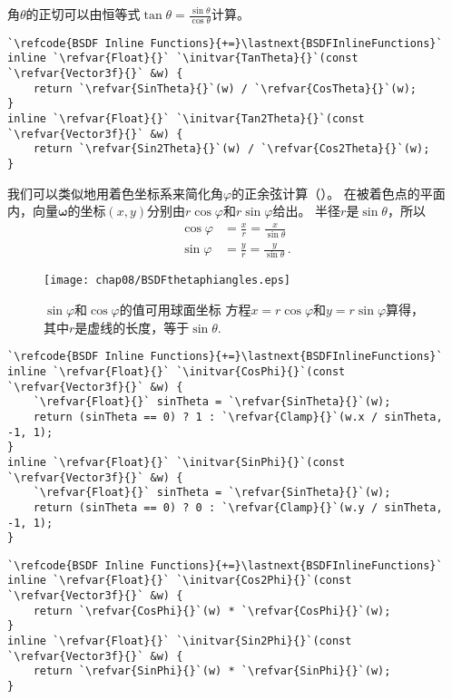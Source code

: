 角$\theta$的正切可以由恒等式$\displaystyle\tan\theta=\frac{\sin\theta}{\cos\theta}$计算。
\begin{lstlisting}
`\refcode{BSDF Inline Functions}{+=}\lastnext{BSDFInlineFunctions}`
inline `\refvar{Float}{}` `\initvar{TanTheta}{}`(const `\refvar{Vector3f}{}` &w) {
    return `\refvar{SinTheta}{}`(w) / `\refvar{CosTheta}{}`(w);
}
inline `\refvar{Float}{}` `\initvar{Tan2Theta}{}`(const `\refvar{Vector3f}{}` &w) {
    return `\refvar{Sin2Theta}{}`(w) / `\refvar{Cos2Theta}{}`(w);
}
\end{lstlisting}

我们可以类似地用着色坐标系来简化角$\varphi$的正余弦计算（）。
在被着色点的平面内，向量$\bm\omega$的坐标$(x,y)$分别由$r\cos\varphi$和$r\sin\varphi$给出。
半径$r$是$\sin\theta$，所以
\begin{align*}
      \cos\varphi & =\frac{x}{r}=\frac{x}{\sin\theta}\,   \\
      \sin\varphi & =\frac{y}{r}=\frac{y}{\sin\theta}\, .
\end{align*}

\begin{figure}[htbp]
      \centering
      \texttt{[image: chap08/BSDFthetaphiangles.eps]}
      \caption{$\sin\varphi$和$\cos\varphi$的值可用球面坐标
            方程$x=r\cos\varphi$和$y=r\sin\varphi$算得，其中$r$是虚线的长度，等于$\sin\theta$.}
      \label{fig:8.3}
\end{figure}

\begin{lstlisting}
`\refcode{BSDF Inline Functions}{+=}\lastnext{BSDFInlineFunctions}`
inline `\refvar{Float}{}` `\initvar{CosPhi}{}`(const `\refvar{Vector3f}{}` &w) {
    `\refvar{Float}{}` sinTheta = `\refvar{SinTheta}{}`(w);
    return (sinTheta == 0) ? 1 : `\refvar{Clamp}{}`(w.x / sinTheta, -1, 1);
}
inline `\refvar{Float}{}` `\initvar{SinPhi}{}`(const `\refvar{Vector3f}{}` &w) {
    `\refvar{Float}{}` sinTheta = `\refvar{SinTheta}{}`(w);
    return (sinTheta == 0) ? 0 : `\refvar{Clamp}{}`(w.y / sinTheta, -1, 1);
}
\end{lstlisting}
\begin{lstlisting}
`\refcode{BSDF Inline Functions}{+=}\lastnext{BSDFInlineFunctions}`
inline `\refvar{Float}{}` `\initvar{Cos2Phi}{}`(const `\refvar{Vector3f}{}` &w) {
    return `\refvar{CosPhi}{}`(w) * `\refvar{CosPhi}{}`(w);
}
inline `\refvar{Float}{}` `\initvar{Sin2Phi}{}`(const `\refvar{Vector3f}{}` &w) {
    return `\refvar{SinPhi}{}`(w) * `\refvar{SinPhi}{}`(w);
}
\end{lstlisting}

